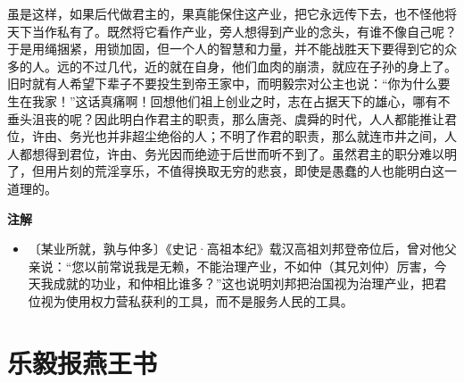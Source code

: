 \documentclass[12pt,UTF-8,openany,a4]{ctexbook}
\begin{document}
\begin{large}
    虽是这样，如果后代做君主的，果真能保住这产业，把它永远传下去，也不怪他将天下当作私有了。既然将它看作产业，旁人想得到产业的念头，有谁不像自己呢？于是用绳捆紧，用锁加固，但一个人的智慧和力量，并不能战胜天下要得到它的众多的人。远的不过几代，近的就在自身，他们血肉的崩溃，就应在子孙的身上了。旧时就有人希望下辈子不要投生到帝王家中，而明毅宗对公主也说：“你为什么要生在我家！”这话真痛啊！回想他们祖上创业之时，志在占据天下的雄心，哪有不垂头沮丧的呢？因此明白作君主的职责，那么唐尧、虞舜的时代，人人都能推让君位，许由、务光也并非超尘绝俗的人；不明了作君的职责，那么就连市井之间，人人都想得到君位，许由、务光因而绝迹于后世而听不到了。虽然君主的职分难以明了，但用片刻的荒淫享乐，不值得换取无穷的悲哀，即使是愚蠢的人也能明白这一道理的。
    
\end{large}


\newpage

\begin{Large}
    \noindent\textbf{注解}
\end{Large}


\vspace{-1em}

\begin{itemize}
    \setlength\itemsep{-0.2em}
    \item〔某业所就，孰与仲多〕{\yiwen 《史记·高祖本纪》载汉高祖刘邦登帝位后，曾对他父亲说：“您以前常说我是无赖，不能治理产业，不如仲（其兄刘仲）厉害，今天我成就的功业，和仲相比谁多？”这也说明刘邦把治国视为治理产业，把君位视为使用权力营私获利的工具，而不是服务人民的工具。}
\end{itemize}

\chapter{乐毅报燕王书}
\end{document}
